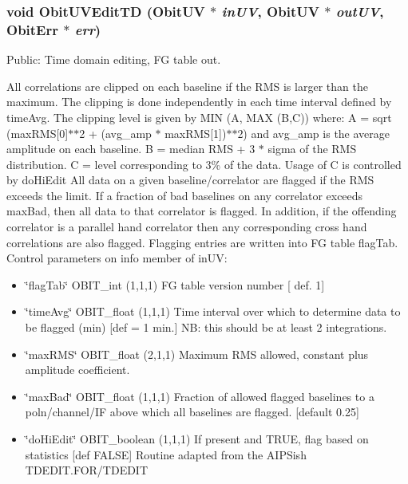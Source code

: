 \subsubsection{\setlength{\rightskip}{0pt plus 5cm}void Obit\-UVEdit\-TD ({\bf Obit\-UV} $\ast$ {\em in\-UV}, {\bf Obit\-UV} $\ast$ {\em out\-UV}, {\bf Obit\-Err} $\ast$ {\em err})}\label{ObitUVEdit_8h_a0}


Public: Time domain editing, FG table out. 

All correlations are clipped on each baseline if the RMS is larger than the maximum. The clipping is done independently in each time interval defined by time\-Avg. The clipping level is given by MIN (A, MAX (B,C)) where: A = sqrt (max\-RMS[0]$\ast$$\ast$2 + (avg\_\-amp $\ast$ max\-RMS[1])$\ast$$\ast$2) and avg\_\-amp is the average amplitude on each baseline. B = median RMS + 3 $\ast$ sigma of the RMS distribution. C = level corresponding to 3\% of the data. Usage of C is controlled by do\-Hi\-Edit All data on a given baseline/correlator are flagged if the RMS exceeds the limit. If a fraction of bad baselines on any correlator exceeds max\-Bad, then all data to that correlator is flagged. In addition, if the offending correlator is a parallel hand correlator then any corresponding cross hand correlations are also flagged. Flagging entries are written into FG table flag\-Tab. Control parameters on info member of in\-UV: \begin{itemize}
\item \char`\"{}flag\-Tab\char`\"{} OBIT\_\-int (1,1,1) FG table version number [ def. 1] \item \char`\"{}time\-Avg\char`\"{} OBIT\_\-float (1,1,1) Time interval over which to determine data to be flagged (min) [def = 1 min.] NB: this should be at least 2 integrations. \item \char`\"{}max\-RMS\char`\"{} OBIT\_\-float (2,1,1) Maximum RMS allowed, constant plus amplitude coefficient. \item \char`\"{}max\-Bad\char`\"{} OBIT\_\-float (1,1,1) Fraction of allowed flagged baselines to a poln/channel/IF above which all baselines are flagged. [default 0.25] \item \char`\"{}do\-Hi\-Edit\char`\"{} OBIT\_\-boolean (1,1,1) If present and TRUE, flag based on statistics [def FALSE] Routine adapted from the AIPSish TDEDIT.FOR/TDEDIT 
\end{itemize}
